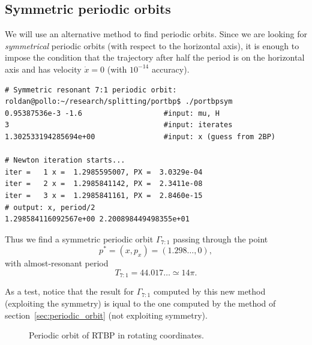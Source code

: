 \documentclass[a4paper]{amsart}
\theoremstyle{remark}
\newtheorem{rem}[thm]{Remark}
\begin{document}

\subsection{Symmetric periodic orbits}\label{sec:symmetric_periodic_orbits}

We will use an alternative method to find periodic orbits. Since we
are looking for \emph{symmetrical} periodic orbits (with respect to
the horizontal axis), it is enough to impose the condition that the
trajectory after half the period is on the horizontal axis and has
velocity $\dot x=0$ (with $10^{-14}$ accuracy).

\begin{verbatim}
# Symmetric resonant 7:1 periodic orbit:
roldan@pollo:~/research/splitting/portbp$ ./portbpsym 
0.95387536e-3 -1.6                   #input: mu, H
3                                    #input: iterates
1.302533194285694e+00                #input: x (guess from 2BP)

# Newton iteration starts...
iter =   1 x =  1.2985595007, PX =  3.0329e-04
iter =   2 x =  1.2985841142, PX =  2.3411e-08
iter =   3 x =  1.2985841161, PX =  2.8460e-15
# output: x, period/2
1.298584116092567e+00 2.200898449498355e+01
\end{verbatim}
Thus we find a symmetric periodic orbit $\Gamma_{7:1}$ passing through the
point 
\[ p^*=(x,p_x)=(1.298\dots,0), \]
with almost-resonant period 
\[ T_{7:1}=44.017\dots\simeq14\pi. \]

As a test, notice that the result for $\Gamma_{7:1}$ computed by this
new method (exploiting the symmetry) is iqual to the one computed by
the method of section~\ref{sec:periodic_orbit} (not exploiting
symmetry).

\begin{figure}[!htbp]
\caption{Periodic orbit of RTBP in rotating coordinates.}
\label{fig:trtbp}
\end{figure}
\end{document}
